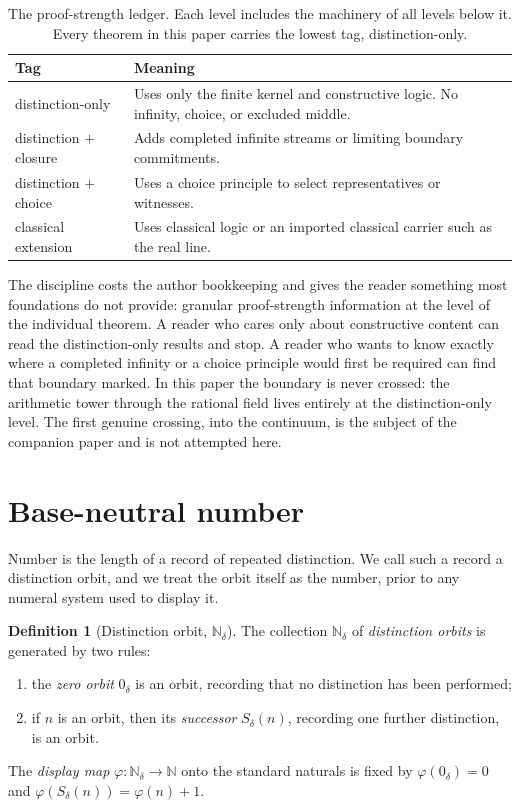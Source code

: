 \documentclass[11pt,a4paper]{article}
\theoremstyle{definition}
\newtheorem{definition}[theorem]{Definition}
\theoremstyle{remark}
\newcommand{\Nd}{\mathbb{N}_\delta}
\newcommand{\Sd}{S_\delta}
\newcommand{\zd}{0_\delta}
\begin{document}
\begin{table}[ht]
\centering
\begin{tabular}{ll}
\toprule
\textbf{Tag} & \textbf{Meaning} \\
\midrule
distinction-only &
  Uses only the finite kernel and constructive logic. No infinity, choice, or excluded middle. \\
distinction $+$ closure &
  Adds completed infinite streams or limiting boundary commitments. \\
distinction $+$ choice &
  Uses a choice principle to select representatives or witnesses. \\
classical extension &
  Uses classical logic or an imported classical carrier such as the real line. \\
\bottomrule
\end{tabular}
\caption{The proof-strength ledger. Each level includes the machinery of all
levels below it. Every theorem in this paper carries the lowest tag,
distinction-only.}
\label{tab:strength}
\end{table}

The discipline costs the author bookkeeping and gives the reader something most
foundations do not provide: granular proof-strength information at the level of
the individual theorem. A reader who cares only about constructive content can
read the distinction-only results and stop. A reader who wants to know exactly
where a completed infinity or a choice principle would first be required can
find that boundary marked. In this paper the boundary is never crossed: the
arithmetic tower through the rational field lives entirely at the
distinction-only level. The first genuine crossing, into the continuum, is the
subject of the companion paper and is not attempted here.

\section{Base-neutral number}\label{sec:number}

Number is the length of a record of repeated distinction. We call such a record
a distinction orbit, and we treat the orbit itself as the number, prior to any
numeral system used to display it.

\begin{definition}[Distinction orbit, $\Nd$]\label{def:orbit}
The collection $\Nd$ of \emph{distinction orbits} is generated by two rules:
\begin{enumerate}[leftmargin=2em, label=\textup{(\roman*)}]
  \item the \emph{zero orbit} $\zd$ is an orbit, recording that no distinction
    has been performed;
  \item if $n$ is an orbit, then its \emph{successor} $\Sd(n)$, recording one
    further distinction, is an orbit.
\end{enumerate}
The \emph{display map} $\varphi \colon \Nd \to \mathbb{N}$ onto the standard
naturals is fixed by $\varphi(\zd) = 0$ and $\varphi(\Sd(n)) = \varphi(n) + 1$.
\end{definition}
\end{document}
